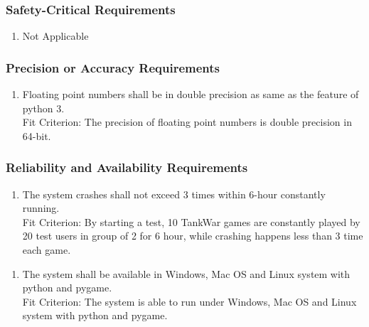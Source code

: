 \documentclass[12pt, titlepage]{article}
\begin{document}
\subsubsection{Safety-Critical Requirements}
\label{ssub:safety_critical_requirements}
\begin{enumerate}[{PR}3. ]
	\item Not Applicable
\end{enumerate}

\subsubsection{Precision or Accuracy Requirements}
\label{ssub:precision_or_accuracy_requirements}
\begin{enumerate}[{PR}4. ]
	\item Floating point numbers shall be in double precision as same as the feature of python 3.
	\\
	
	Fit Criterion: The precision of floating point numbers is double precision in 64-bit.
\end{enumerate}

\subsubsection{Reliability and Availability Requirements}
\label{ssub:reliability_and_availability_requirements}
\begin{enumerate}[{PR}5. ]
	\item The system crashes shall not exceed 3 times within 6-hour constantly running.
	\\
	
	Fit Criterion: By starting a test, 10 TankWar games are constantly played by 20 test users in group of 2 for 6 hour, while crashing happens less than 3 time each game.
\end{enumerate}

\begin{enumerate}[{PR}6. ]
	\item The system shall be available in Windows, Mac OS and Linux system with python and pygame.
	\\
	
	Fit Criterion: The system is able to run under Windows, Mac OS and Linux system with python and pygame.
\end{enumerate}
\end{document}
